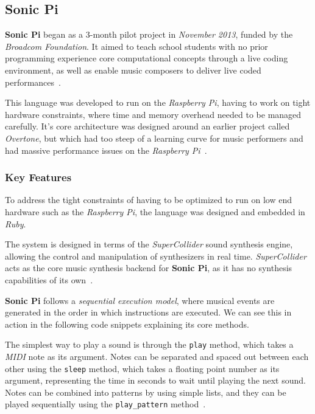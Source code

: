 \subsection{Sonic Pi}\label{subsec:sonic-pi}

\textbf{Sonic Pi} began as a 3-month pilot project in \textit{November 2013}, funded by the \textit{Broadcom
Foundation}.
It aimed to teach school students with no prior programming experience core computational concepts through a live coding
environment, as well as enable music composers to deliver live coded performances~\cite{Aaron_Blackwell_2013,
Aaron_2016}.

This language was developed to run on the \textit{Raspberry Pi}, having to work on tight hardware constraints, where
time and memory overhead needed to be managed carefully.
It's core architecture was designed around an earlier project called \textit{Overtone}, but which had too steep of a
learning curve for music performers and had massive performance issues on the \textit{Raspberry Pi}~\cite{Aaron_2016}.


\subsubsection{Key Features}

To address the tight constraints of having to be optimized to run on low end hardware such as the \textit{Raspberry Pi},
the language was designed and embedded in \textit{Ruby}.

The system is designed in terms of the \textit{SuperCollider} sound synthesis engine, allowing the control
and manipulation of synthesizers in real time.
\textit{SuperCollider} acts as the core music synthesis backend for \textbf{Sonic Pi}, as it has no synthesis
capabilities of its own~\cite{Aaron_Blackwell_2013}.

\textbf{Sonic Pi} follows a \textit{sequential execution model}, where musical events are generated in the order in
which instructions are executed.
We can see this in action in the following code snippets explaining its core methods.

The simplest way to play a sound is through the \texttt{play} method, which takes a \textit{MIDI} note as its argument.
Notes can be separated and spaced out between each other using the \texttt{sleep} method, which takes a floating point
number as its argument, representing the time in seconds to wait until playing the next sound.
Notes can be combined into patterns by using simple lists, and they can be played sequentially using the
\texttt{play\_pattern} method~\cite{Aaron_Blackwell_2013}.

